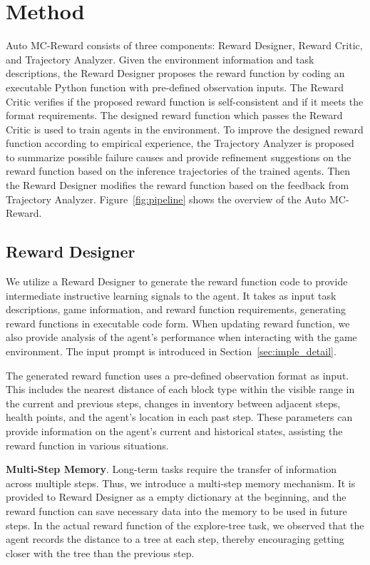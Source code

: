 \section{Method}
\label{sec:method}

Auto MC-Reward consists of three components: Reward Designer, Reward Critic, and Trajectory Analyzer. Given the environment information and task descriptions, the Reward Designer proposes the reward function by coding an executable Python function with pre-defined observation inputs. The Reward Critic verifies if the proposed reward function is self-consistent and if it meets the format requirements. The designed reward function which passes the Reward Critic is used to train agents in the environment. To improve the designed reward function according to empirical experience, the Trajectory Analyzer is proposed to summarize possible failure causes and provide refinement suggestions on the reward function based on the inference trajectories of the trained agents. Then the Reward Designer modifies the reward function based on the feedback from Trajectory Analyzer. Figure~\ref{fig:pipeline} shows the overview of the Auto MC-Reward.


\subsection{Reward Designer}
\label{sec:designer}

We utilize a Reward Designer to generate the reward function code to provide intermediate instructive learning signals to the agent. It takes as input task descriptions, game information, and reward function requirements, generating reward functions in executable code form. When updating reward function, we also provide analysis of the agent's performance when interacting with the game environment. The input prompt is introduced in Section~\ref{sec:imple_detail}.

The generated reward function uses a pre-defined observation format as input. This includes the nearest distance of each block type within the visible range in the current and previous steps, changes in inventory between adjacent steps, health points, and the agent's location in each past step. These parameters can provide information on the agent's current and historical states, assisting the reward function in various situations.



\vspace{0.5em}\noindent\textbf{Multi-Step Memory}. Long-term tasks require the transfer of information across multiple steps. 
Thus, we introduce a multi-step memory mechanism. It is provided to Reward Designer as a empty dictionary at the beginning, and the reward function can save necessary data into the memory to be used in future steps.
In the actual reward function of the explore-tree task, we observed that the agent records the distance to a tree at each step, thereby encouraging getting closer with the tree than the previous step.

